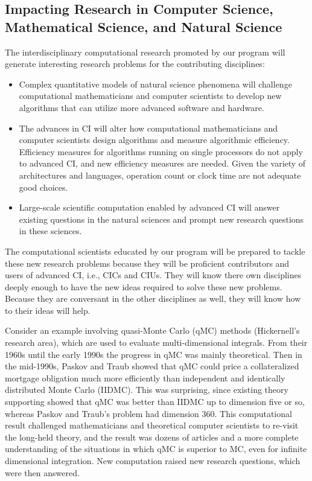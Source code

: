 \documentclass[11pt]{NSFamsart}
\begin{document}
\subsection{Impacting Research in Computer Science, Mathematical Science, and Natural Science}
The interdisciplinary computational research promoted by our program will generate interesting research problems for the contributing disciplines:
\begin{itemize}
\item Complex quantitative models of natural science phenomena will challenge computational mathematicians and computer scientists to develop new algorithms that can utilize more advanced software and hardware.  
\item The advances in CI will alter how computational mathematicians and computer scientists design algorithms and measure algorithmic efficiency.  Efficiency measures for algorithms running on single processors do not apply to advanced CI, and new efficiency measures are needed.  Given the variety of architectures and languages, operation count or  clock time are not adequate good choices.
\item Large-scale scientific computation enabled by advanced CI will answer existing questions in the natural sciences and prompt new research questions in these sciences.  
\end{itemize}
The computational scientists educated by our program will be prepared to tackle these new research problems because they will be proficient contributors and users of advanced CI, i.e., CICs and CIUs.  They will know there own disciplines deeply enough to have the new ideas required to solve these new problems.  Because they are conversant in the other disciplines as well, they will know how to their ideas will help.

Consider an example involving quasi-Monte Carlo (qMC) methods (Hickernell's research area), which are used to evaluate multi-dimensional integrals. From their 1960s until the early 1990s the progress in qMC was mainly theoretical.  Then in the mid-1990s, Paskov and Traub \cite{PasTra95} showed that qMC could price a collateralized mortgage obligation much more efficiently than independent and identically distributed Monte Carlo (IIDMC).  This was surprising, since existing theory supporting showed that qMC was better than IIDMC up to dimension five or so, whereas Paskov and Traub's problem had dimension 360.  This computational result challenged mathematicians and theoretical computer scientists to re-visit the long-held theory, and the result was dozens of articles and a more complete understanding of the situations in which qMC is superior to MC, even for infinite dimensional integration.  New computation raised new research questions, which  were then answered.
\end{document}
